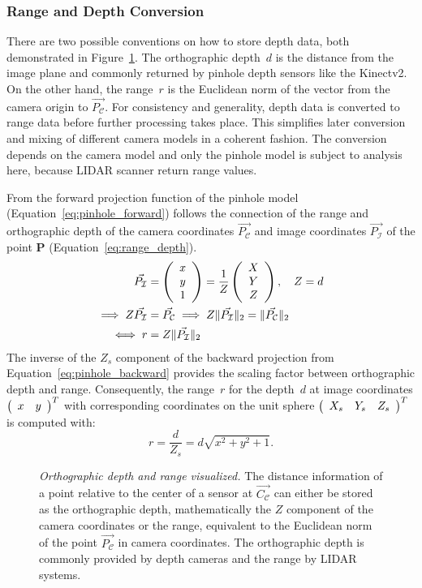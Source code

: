 \subsubsection{Range and Depth Conversion}\label{sec:range_depth_conversion}

There are two possible conventions on how to store depth data, both demonstrated in Figure~\ref{fig:range_depth}.
The orthographic depth~$d$ is the distance from the image plane and commonly returned by pinhole depth sensors like the Kinectv2\cite{wasenmuller_accv2016}.
On the other hand, the range~$r$ is the Euclidean norm of the vector from the camera origin to $\vec{P_\mathcal{C}}$.
For consistency and generality, depth data is converted to range data before further processing takes place.
This simplifies later conversion and mixing of different camera models in a coherent fashion.
The conversion depends on the camera model and only the pinhole model is subject to analysis here, because \acrshort{LIDAR} scanner return range values.

\pagebreak
From the forward projection function of the pinhole model (Equation~\ref{eq:pinhole_forward}) follows the connection of the range and orthographic depth of the camera coordinates $\vec{P_\mathcal{C}}$ and image coordinates $\vec{P_\mathcal{I}}$ of the point $\mathbf{P}$ (Equation~\ref{eq:range_depth}).
\begin{equation}
\begin{aligned}
    \vec{P_\mathcal{I}} &= \left(\begin{array}{c} x \\ y \\ 1 \end{array}\right) = \frac{1}{Z}\left(\begin{array}{c} X \\ Y \\ Z \end{array}\right),\quad Z = d \\
    \implies Z \vec{P_\mathcal{I}} &= \vec{P_\mathcal{C}} \implies Z \lVert\vec{P_\mathcal{I}}\rVert_{2} = \lVert\vec{P_\mathcal{C}}\rVert_{2} \\
    \iff r &= Z \lVert\vec{P_\mathcal{I}}\rVert_{2}
    \label{eq:range_depth}
\end{aligned}
\end{equation}
The inverse of the $Z_{s}$ component of the backward projection from Equation~\ref{eq:pinhole_backward} provides the scaling factor between orthographic depth and range.
Consequently, the range~$r$ for the depth~$d$ at image coordinates $\left(\begin{array}{cc} x & y \end{array}\right)^T$ with corresponding coordinates on the unit sphere $\left(\begin{array}{ccc} X_s & Y_s & Z_s \end{array}\right)^T$ is computed with:
\begin{equation}
    r = \frac{d}{Z_s} = d \sqrt{x^2 + y^2 + 1}\text{.}
\end{equation}
\begin{figure}[hb]
    \scalebox{0.8}{%
    
    }
    \caption[Orthographic depth and range visualized]{\emph{Orthographic depth and range visualized.} The distance information of a point relative to the center of a sensor at $\vec{C_\mathcal{C}}$ can either be stored as the orthographic depth, mathematically the $Z$ component of the camera coordinates or the range, equivalent to the Euclidean norm of the point $\vec{P_\mathcal{C}}$ in camera coordinates. The orthographic depth is commonly provided by depth cameras and the range by \acrshort{LIDAR} systems.}
    \label{fig:range_depth}
\end{figure}
